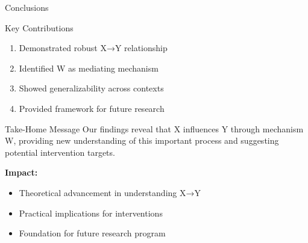 \documentclass[aspectratio=169,11pt]{beamer}
\begin{document}
\begin{frame}{Conclusions}
  \begin{exampleblock}{Key Contributions}
    \begin{enumerate}
      \item Demonstrated robust X→Y relationship
      \item Identified W as mediating mechanism
      \item Showed generalizability across contexts
      \item Provided framework for future research
    \end{enumerate}
  \end{exampleblock}

  \vspace{0.5cm}

  \begin{block}{Take-Home Message}
    Our findings reveal that X influences Y through mechanism W, providing new understanding of this important process and suggesting potential intervention targets.
  \end{block}

  \vspace{0.5cm}

  \textbf{Impact:}
  \begin{itemize}
    \item Theoretical advancement in understanding X→Y
    \item Practical implications for interventions
    \item Foundation for future research program
  \end{itemize}
\end{frame}
\end{document}
